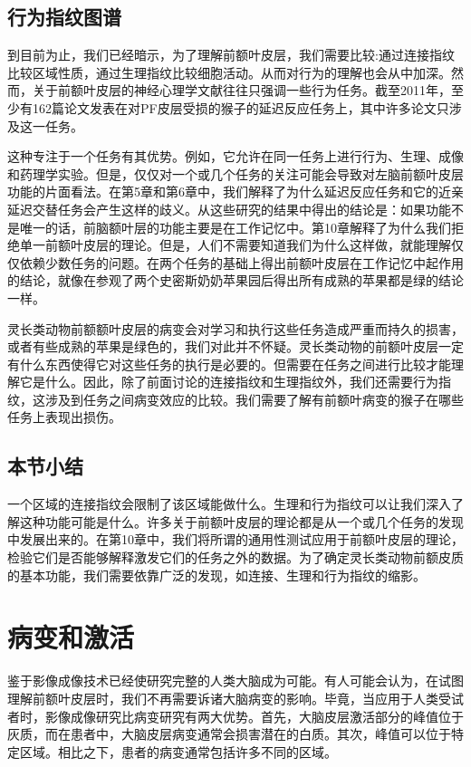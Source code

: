 \subsection{行为指纹图谱}
到目前为止，我们已经暗示，为了理解前额叶皮层，我们需要比较:通过连接指纹比较区域性质，通过生理指纹比较细胞活动。从而对行为的理解也会从中加深。然而，关于前额叶皮层的神经心理学文献往往只强调一些行为任务。截至2011年，至少有162篇论文发表在对PF皮层受损的猴子的延迟反应任务上，其中许多论文只涉及这一任务。

\par
这种专注于一个任务有其优势。例如，它允许在同一任务上进行行为、生理、成像和药理学实验。但是，仅仅对一个或几个任务的关注可能会导致对左脑前额叶皮层功能的片面看法。在第5章和第6章中，我们解释了为什么延迟反应任务和它的近亲延迟交替任务会产生这样的歧义。从这些研究的结果中得出的结论是：如果功能不是唯一的话，前脑额叶层的功能主要是在工作记忆中。第10章解释了为什么我们拒绝单一前额叶皮层的理论。但是，人们不需要知道我们为什么这样做，就能理解仅仅依赖少数任务的问题。在两个任务的基础上得出前额叶皮层在工作记忆中起作用的结论，就像在参观了两个史密斯奶奶苹果园后得出所有成熟的苹果都是绿的结论一样。
\par
灵长类动物前额额叶皮层的病变会对学习和执行这些任务造成严重而持久的损害，或者有些成熟的苹果是绿色的，我们对此并不怀疑。灵长类动物的前额叶皮层一定有什么东西使得它对这些任务的执行是必要的。但需要在任务之间进行比较才能理解它是什么。因此，除了前面讨论的连接指纹和生理指纹外，我们还需要行为指纹，这涉及到任务之间病变效应的比较。我们需要了解有前额叶病变的猴子在哪些任务上表现出损伤。

\subsection{本节小结}
一个区域的连接指纹会限制了该区域能做什么。生理和行为指纹可以让我们深入了解这种功能可能是什么。许多关于前额叶皮层的理论都是从一个或几个任务的发现中发展出来的。在第10章中，我们将所谓的通用性测试应用于前额叶皮层的理论，检验它们是否能够解释激发它们的任务之外的数据。为了确定灵长类动物前额皮质的基本功能，我们需要依靠广泛的发现，如连接、生理和行为指纹的缩影。

\section{病变和激活}
鉴于影像成像技术已经使研究完整的人类大脑成为可能。有人可能会认为，在试图理解前额叶皮层时，我们不再需要诉诸大脑病变的影响。毕竟，当应用于人类受试者时，影像成像研究比病变研究有两大优势。首先，大脑皮层激活部分的峰值位于灰质，而在患者中，大脑皮层病变通常会损害潜在的白质。其次，峰值可以位于特定区域。相比之下，患者的病变通常包括许多不同的区域。

